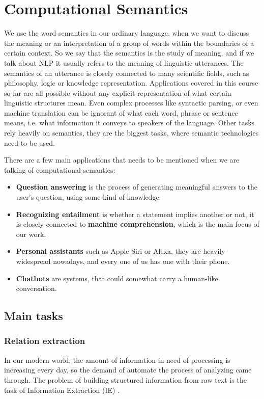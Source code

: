 \chapter{Computational Semantics}
\label{chap:compsem}
We use the word semantics in our ordinary language, when we want to discuss the meaning or an interpretation of a group of words within the boundaries of a certain context.
So we say that the semantics is the study of meaning, and if we talk about NLP it usually refers to the meaning of linguistic utterances.
The semantics of an utterance is closely connected to many scientific fields, such as philosophy, logic or knowledge representation.
Applications covered in this course so far are all possible without any explicit representation of what certain linguistic structures mean.
Even complex processes like syntactic parsing, or even machine translation can be ignorant of what each word, phrase or sentence means, i.e. what information it conveys to speakers of the language.
Other tasks rely heavily on semantics, they are the biggest tasks, where semantic technologies need to be used.

There are a few main applications that needs to be mentioned when we are talking of computational semantics:
\begin{itemize}
	\item \textbf{Question answering} is the process of generating meaningful answers to the user's question, using some kind of knowledge.
	\item \textbf{Recognizing entailment} is whether a statement implies another or not, it is closely connected to \textbf{machine comprehension}, which is the main focus of our work.
	\item \textbf{Personal assistants} such as Apple Siri or Alexa, they are heavily widespread nowadays, and every one of us has one with their phone.
	\item \textbf{Chatbots} are systems, that could somewhat carry a human-like conversation.
\end{itemize}
\section{Main tasks}
\subsection{Relation extraction}
In our modern world, the amount of information in need of processing is increasing every day, so the demand of automate the process of analyzing came through. The problem of building structured information from raw text is the task of Information Extraction (IE) \cite{Jurafsky:2009}.

